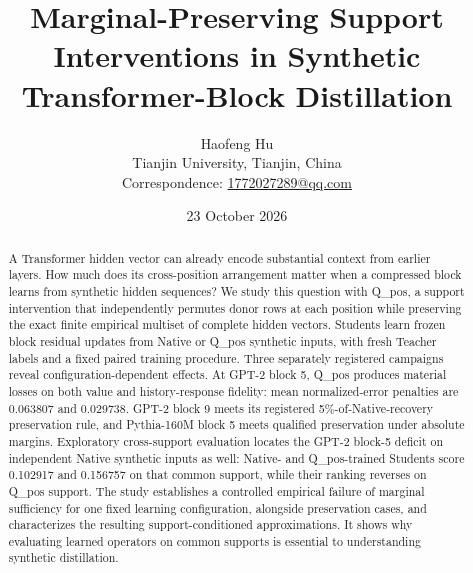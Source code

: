 \documentclass[11pt,a4paper]{article}
\title{Marginal-Preserving Support Interventions in Synthetic Transformer-Block Distillation}
\author{Haofeng Hu\\[0.4em]\small Tianjin University, Tianjin, China\\
\small Correspondence: \href{mailto:1772027289@qq.com}{1772027289@qq.com}}
\date{23 October 2026}
\begin{document}
\maketitle
\begin{abstract}
A Transformer hidden vector can already encode substantial context from earlier layers. How much does its cross-position arrangement matter when a compressed block learns from synthetic hidden sequences? We study this question with Q\_pos, a support intervention that independently permutes donor rows at each position while preserving the exact finite empirical multiset of complete hidden vectors. Students learn frozen block residual updates from Native or Q\_pos synthetic inputs, with fresh Teacher labels and a fixed paired training procedure. Three separately registered campaigns reveal configuration-dependent effects. At GPT-2 block 5, Q\_pos produces material losses on both value and history-response fidelity: mean normalized-error penalties are 0.063807 and 0.029738. GPT-2 block 9 meets its registered 5\%-of-Native-recovery preservation rule, and Pythia-160M block 5 meets qualified preservation under absolute margins. Exploratory cross-support evaluation locates the GPT-2 block-5 deficit on independent Native synthetic inputs as well: Native- and Q\_pos-trained Students score 0.102917 and 0.156757 on that common support, while their ranking reverses on Q\_pos support. The study establishes a controlled empirical failure of marginal sufficiency for one fixed learning configuration, alongside preservation cases, and characterizes the resulting support-conditioned approximations. It shows why evaluating learned operators on common supports is essential to understanding synthetic distillation.

\end{abstract}

\FloatBarrier


\clearpage
\appendix
{}
\renewcommand{\thetable}{\Alph{section}\arabic{table}}
\renewcommand{\thefigure}{\Alph{section}\arabic{figure}}

\end{document}
